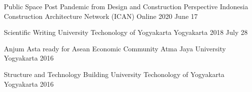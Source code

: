 

\begin{cvhonors}
  \cvhonor
    {Public Space Post Pandemic from Design and Construction Perspective} %
    {Indonesia Construction Architecture Network (ICAN)} %
    {Online} %
    {2020 June 17} %

  \cvhonor
    {Scientific Writing} %
    {University Techonology of Yogyakarta} %
    {Yogyakarta} %
    {2018 July 28} %

  \cvhonor
    {Anjum Asta ready for Asean Economic Community} %
    {Atma Jaya University} %
    {Yogyakarta} %
    {2016} %

  \cvhonor
    {Structure and Technology Building} %
    {University Techonology of Yogyakarta} %
    {Yogyakarta} %
    {2016} %

\end{cvhonors}
